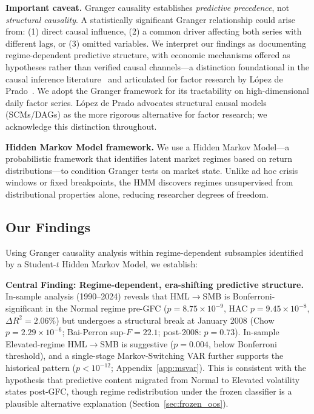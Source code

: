 \documentclass[sigconf,anonymous]{acmart}
\begin{document}
\textbf{Important caveat.} Granger causality establishes \emph{predictive precedence},
not \emph{structural causality}. A statistically significant Granger relationship
could arise from: (1) direct causal influence, (2) a common driver affecting both
series with different lags, or (3) omitted variables. We interpret our findings as documenting regime-dependent predictive structure,
with economic mechanisms offered as hypotheses rather than verified causal channels---a
distinction foundational in the causal inference literature~\cite{pearl2009causality}
and articulated for factor research by L\'opez de Prado~\cite{lopezdeprado2023causal}.
We adopt the Granger framework for its tractability on high-dimensional daily
factor series. L\'opez de Prado advocates structural causal models (SCMs/DAGs)
as the more rigorous alternative for factor research; we acknowledge this
distinction throughout.

\textbf{Hidden Markov Model framework.} We use a Hidden Markov Model---a
probabilistic framework that identifies latent market regimes based on return
distributions---to condition Granger tests on market state. Unlike ad hoc crisis
windows or fixed breakpoints, the HMM discovers regimes unsupervised from
distributional properties alone, reducing researcher degrees of freedom.

\subsection{Our Findings}

Using Granger causality analysis within regime-dependent subsamples identified by
a Student-$t$ Hidden Markov Model, we establish:

\textbf{Central Finding: Regime-dependent, era-shifting predictive structure.}
In-sample analysis (1990--2024) reveals that HML$\to$SMB is Bonferroni-significant in
the Normal regime pre-GFC ($p = 8.75 \times 10^{-9}$, HAC $p = 9.45 \times 10^{-8}$,
$\Delta R^2 = 2.06\%$) but undergoes a structural break at January 2008
(Chow $p = 2.29\times10^{-6}$; Bai-Perron sup-$F = 22.1$; post-2008: $p = 0.73$).
In-sample Elevated-regime HML$\to$SMB is suggestive ($p = 0.004$, below Bonferroni
threshold), and a single-stage Markov-Switching VAR further supports the historical
pattern ($p < 10^{-12}$; Appendix~\ref{app:msvar}). This is consistent with the
hypothesis that predictive content migrated from Normal to Elevated volatility
states post-GFC, though regime redistribution under the frozen classifier is a
plausible alternative explanation (Section~\ref{sec:frozen_oos}).
\end{document}
